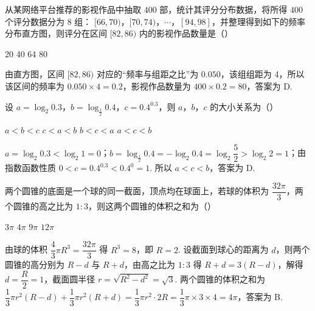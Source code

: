 \begin{problem}
从某网络平台推荐的影视作品中抽取 \( 400 \) 部，统计其评分分布数据，将所得 \( 400 \) 个评分数据分为 \( 8 \) 组：
\( [66,70) \)，\( [70,74) \)，\(\cdots\)，\( [94,98] \)，并整理得到如下的频率分布直方图，则评分在区间 \( [82,86) \) 内的影视作品数量是（\quad）


\choices
    {20}
    {40}
    {64}
    {80}
\end{problem}


\begin{solution}
由直方图，区间 \([82,86)\) 对应的“频率与组距之比”为 \(0.050\)，该组组距为 4，所以该区间的频率为 \(0.050\times4=0.2\)，影视作品数量为 \(400\times0.2=80\)，答案为 D.
\end{solution}

\begin{problem}
设 \( a=\log_{2}0.3 \)，\( b=\log_{\frac{1}{2}}0.4 \)，\( c=0.4^{0.3} \)，则 \(a\)，\(b\)，\(c\) 的大小关系为（\quad）

\choices
    {\(a<b<c\)}
    {\(c<a<b\)}
    {\(b<c<a\)}
    {\(a<c<b\)}
\end{problem}


\begin{solution}
\(a=\log_{2}0.3<\log_{2}1=0\)；\(b=\log_{\frac12}0.4=-\log_{2}0.4=\log_{2}\dfrac52>\log_{2}2=1\)；由指数函数性质 \(0<c=0.4^{0.3}<0.4^{0}=1\). 所以 \(a<c<b\)，答案为 D.
\end{solution}

\begin{problem}
两个圆锥的底面是一个球的同一截面，顶点均在球面上，若球的体积为 \( \dfrac{32\pi}{3} \)，两个圆锥的高之比为 \( 1:3 \)，则这两个圆锥的体积之和为（\quad）

\choices
    {\(3\pi\)}
    {\(4\pi\)}
    {\(9\pi\)}
    {\(12\pi\)}
\end{problem}


\begin{solution}
由球的体积 \(\dfrac43\pi R^3=\dfrac{32\pi}{3}\) 得 \(R^3=8\)，即 \(R=2\). 设截面到球心的距离为 \(d\)，则两个圆锥的高分别为 \(R-d\) 与 \(R+d\)，由高之比为 \(1:3\) 得 \(R+d=3(R-d)\)，解得 \(d=\dfrac R2=1\)，截面圆半径 \(r=\sqrt{R^2-d^2}=\sqrt3\). 两个圆锥的体积之和为 \(\dfrac13\pi r^2(R-d)+\dfrac13\pi r^2(R+d)=\dfrac13\pi r^2\cdot2R=\dfrac13\pi\times3\times4=4\pi\)，答案为 B.
\end{solution}

